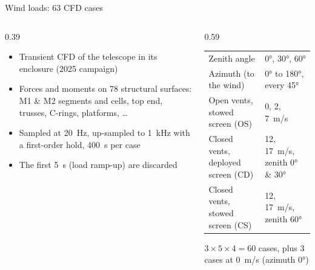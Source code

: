 \documentclass[10pt,aspectratio=169]{beamer}
\begin{document}
\begin{frame}{Wind loads: 63 CFD cases}
  \begin{columns}[c]
    \begin{column}{0.39\textwidth}
      \begin{itemize}
        \item Transient CFD of the telescope in its enclosure (2025 campaign)
        \item Forces and moments on 78 structural surfaces: M1 \& M2 segments and cells, top end, trusses, C-rings, platforms, \ldots
        \item Sampled at \SI{20}{Hz}, up-sampled to \SI{1}{kHz} with a first-order hold, \SI{400}{s} per case
        \item The first \SI{5}{s} (load ramp-up) are discarded
      \end{itemize}
    \end{column}
    \begin{column}{0.59\textwidth}
      \footnotesize
      \begin{tabular}{@{}ll@{}}
        \toprule
        Zenith angle & \ang{0}, \ang{30}, \ang{60}\\
        Azimuth (to the wind) & \ang{0} to \ang{180}, every \ang{45}\\
        \midrule
        Open vents, stowed screen (OS) & 0, 2, \SI{7}{m/s}\\
        Closed vents, deployed screen (CD) & 12, \SI{17}{m/s}, zenith \ang{0} \& \ang{30}\\
        Closed vents, stowed screen (CS) & 12, \SI{17}{m/s}, zenith \ang{60}\\
        \bottomrule
      \end{tabular}

      \vspace{2mm}
      $3\times5\times4 = 60$ cases, plus 3 cases at \SI{0}{m/s} (azimuth \ang{0})
    \end{column}
  \end{columns}
\end{frame}
\end{document}
